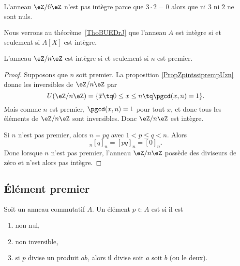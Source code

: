 \begin{example}
	L'anneau \( \eZ/6\eZ\) n'est pas intègre parce que \( 3\cdot 2=0\) alors que ni \( 3\) ni \( 2\) ne sont nuls.
\end{example}

Nous verrons au théorème~\ref{ThoBUEDrJ} que l'anneau \( A\) est intègre si et seulement si \( A[X]\) est intègre.

\begin{corollary}   \label{CorZnInternprem}
	L'anneau \( \eZ/n\eZ\) est intègre si et seulement si \( n\) est premier.
\end{corollary}

\begin{proof}
	Supposons que \( n\) soit premier. La proposition \ref{PropZpintssiprempUzn} donne les inversibles de \( \eZ/n\eZ\) par
	\begin{equation}
		U(\eZ/n\eZ)=\{ \overline x\tq 0\leq x\leq n\tq\pgcd(x,n)=1 \}.
	\end{equation}
	Mais comme \( n\) est premier, \( \pgcd(x,n)=1\) pour tout \( x\), et donc tous les éléments de \( \eZ/n\eZ\) sont inversibles. Donc \( \eZ/n\eZ\) est intègre.

	Si \( n\) n'est pas premier, alors \( n=pq\) avec \( 1<p\leq q<n\). Alors
	\begin{equation}
		[p]_n[q]_n=[pq]_n=[0]_n.
	\end{equation}
	Donc lorsque \( n\) n'est pas premier,  l'anneau \( \eZ/n\eZ\) possède des diviseurs de zéro et n'est alors pas intègre.
\end{proof}


\subsection{Élément premier}

\begin{definition}       \label{DEFooZCRQooWXRalw}
	Soit un anneau commutatif \( A\). Un élément \( p\in A\) est  si il est
	\begin{enumerate}
		\item
		      non nul,
		\item
		      non inversible,
		\item       \label{ITEMooPMTTooCVHPIm}
		      si \( p\) divise un produit \( ab\), alors il divise soit \( a\) soit \( b\) (ou le deux).
	\end{enumerate}
\end{definition}


